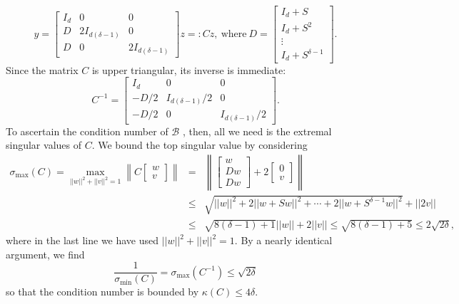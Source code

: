 %
\[y = \begin{bmatrix} I_d & 0 & 0 \\ D & 2 I_{d(\delta - 1)} & 0 \\ D & 0 & 2 I_{d(\delta - 1)} \end{bmatrix}z =: Cz, \ \text{where} \ D = \begin{bmatrix} I_d + S \\ I_d + S^2 \\ \vdots \\ I_d + S^{\delta - 1} \end{bmatrix}.\]  Since the matrix $C$ is upper triangular, its inverse is immediate: \[C^{-1} = \begin{bmatrix} I_d & 0 & 0 \\ -D / 2 & I_{d(\delta-1)} / 2 & 0 \\ -D / 2 & 0 & I_{d(\delta-1)} / 2 \end{bmatrix}.\]  To ascertain the condition number of $\mathcal{B}$%
, then, all we need is the extremal singular values of $C$.  We bound the top singular value by considering 
\[\begin{array}{rcl} \sigma_{\max}(C) = \max\limits_{||w||^2 + ||v||^2 = 1} \left\lVert C\begin{bmatrix} w \\ v \end{bmatrix} \right\rVert  & = & \left\lVert \begin{bmatrix} w \\ D w \\ D w \end{bmatrix} + 2\begin{bmatrix} 0 \\ v \end{bmatrix} \right\rVert \\
& \le & \sqrt{||w||^2 + 2 ||w + Sw||^2 + \cdots + 2 ||w + S^{\delta - 1} w||^2} + ||2 v|| \\
& \le & \sqrt{8 (\delta - 1) + 1}||w|| + 2 ||v|| \le \sqrt{8(\delta - 1) + 5} \le 2\sqrt{2 \delta},  \end{array}\]  where in the last line we have used $||w||^2 + ||v||^2 = 1$.  By a nearly identical argument, we find \[\dfrac{1}{\sigma_{\min}(C)} = \sigma_{\max}(C^{-1}) \le \sqrt{2 \delta}\] so that the condition number is bounded by $\kappa(C) \le 4\delta$.
